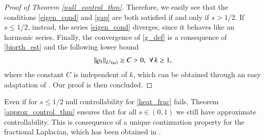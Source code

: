 \begin{proof}[Proof of Theorem \ref{null_control_thm}]
Therefore, we easily see that the conditions \eqref{eigen_cond} and \eqref{gap} are both satisfied if and only if $s>1/2$. If $s\leq 1/2$, instead, the series \eqref{eigen_cond} diverges, since it behaves like an harmonic series. Finally, the convergence of \eqref{g_def} is a consequence of \eqref{biorth_est} and the following lower bound 
\begin{align*}
	{\left\|\varrho_k\right\|}_{L^2(\omega)}\geq C>0, \,\,\forall \, k\geq 1,
\end{align*}
where the constant $C$ is independent of $k$, which can be obtained through an easy adaptation of \cite[Lemma 2]{kwasnicki2012eigenvalues}. Our proof is then concluded.
\end{proof}

Even if for $s\leq 1/2$ null controllability for \eqref{heat_frac} fails, Theorem \ref{approx_control_thm} ensures that for all $s\in(0,1)$ we still have approximate controllability. This is consequence of a unique continuation property for the fractional Laplacian, which has been obtained in \cite{fall2014unique}.

